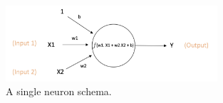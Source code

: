 \begin{figure}[!htb]	\includegraphics[width=0.7\textwidth]{images/single_neuron.png} 
    \centering

\caption{
A single neuron schema.\cite{ABlog}
} 

\label{fig:single_neuron}
\end{figure}